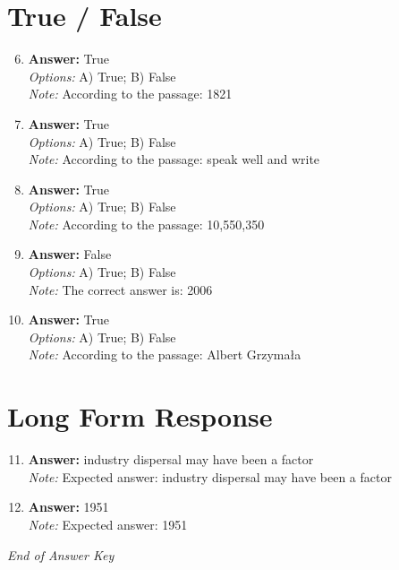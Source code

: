 \documentclass[12pt]{article}
\begin{document}
\section*{True / False}
\begin{enumerate}[label=\arabic*.]
\setcounter{enumi}{5}
\item \textbf{Answer:} True
\\ \textit{Options:} A) True; B) False
\\ \textit{Note:} According to the passage: 1821
\item \textbf{Answer:} True
\\ \textit{Options:} A) True; B) False
\\ \textit{Note:} According to the passage: speak well and write
\item \textbf{Answer:} True
\\ \textit{Options:} A) True; B) False
\\ \textit{Note:} According to the passage: 10,550,350
\item \textbf{Answer:} False
\\ \textit{Options:} A) True; B) False
\\ \textit{Note:} The correct answer is: 2006
\item \textbf{Answer:} True
\\ \textit{Options:} A) True; B) False
\\ \textit{Note:} According to the passage: Albert Grzymała
\end{enumerate}

\section*{Long Form Response}
\begin{enumerate}[label=\arabic*.]
\setcounter{enumi}{10}
\item \textbf{Answer:} industry dispersal may have been a factor
\\ \textit{Note:} Expected answer: industry dispersal may have been a factor
\item \textbf{Answer:} 1951
\\ \textit{Note:} Expected answer: 1951
\end{enumerate}

\vfill
\noindent\textit{End of Answer Key}
\end{document}

